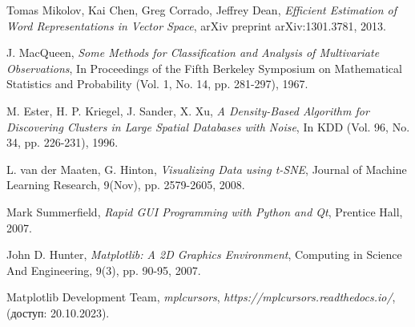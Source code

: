 \begin{thebibliography}{9}
Tomas Mikolov, Kai Chen, Greg Corrado, Jeffrey Dean, \emph{Efficient Estimation of Word Representations in Vector Space}, arXiv preprint arXiv:1301.3781, 2013.

J. MacQueen, \emph{Some Methods for Classification and Analysis of Multivariate Observations}, In Proceedings of the Fifth Berkeley Symposium on Mathematical Statistics and Probability (Vol. 1, No. 14, pp. 281-297), 1967.

M. Ester, H. P. Kriegel, J. Sander, X. Xu, \emph{A Density-Based Algorithm for Discovering Clusters in Large Spatial Databases with Noise}, In KDD (Vol. 96, No. 34, pp. 226-231), 1996.

L. van der Maaten, G. Hinton, \emph{Visualizing Data using t-SNE}, Journal of Machine Learning Research, 9(Nov), pp. 2579-2605, 2008.


Mark Summerfield, \emph{Rapid GUI Programming with Python and Qt}, Prentice Hall, 2007.

John D. Hunter, \emph{Matplotlib: A 2D Graphics Environment}, Computing in Science And Engineering, 9(3), pp. 90-95, 2007.

Matplotlib Development Team, \emph{mplcursors}, \emph{https://mplcursors.readthedocs.io/}, (доступ: 20.10.2023).




\end{thebibliography}

